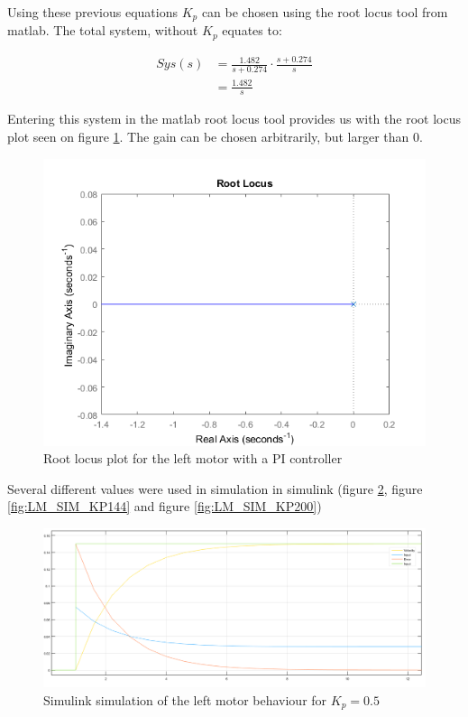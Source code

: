Using these previous equations $K_p$ can be chosen using the root locus tool from matlab. The total system, without $K_p$ equates to:

\begin{align}
    Sys(s) &= \frac{1.482}{s+0.274} \cdot \frac{s+0.274}{s} \\[12pt]
     &= \frac{1.482}{s}
\end{align}

Entering this system in the matlab root locus tool provides us with the  root locus plot seen on figure \ref{fig:LM_rl}. The gain can be chosen arbitrarily, but larger than 0.

\begin{figure}[htbp]
\centering
\includegraphics[width = .7\textwidth]{pics/LM_cont_rlocus.png}
\caption{Root locus plot for the left motor with a PI controller}
\label{fig:LM_rl}
\end{figure}

Several different values were used in simulation in simulink (figure \ref{fig:LM_SIM_KP050}, figure \ref{fig:LM_SIM_KP144} and figure \ref{fig:LM_SIM_KP200})


\begin{figure}[htbp]
\centering
\includegraphics[width = \textwidth]{pics/LM_KP050_Sim.png}
\caption{Simulink simulation of the left motor behaviour for $K_p = 0.5$}
\label{fig:LM_SIM_KP050}
\end{figure}

